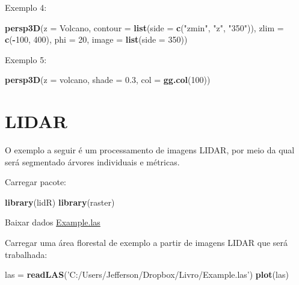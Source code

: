 \documentclass[
]{book}
\newenvironment{Shaded}{\begin{snugshade}}{\end{snugshade}}
\newcommand{\DataTypeTok}[1]{\textcolor[rgb]{0.13,0.29,0.53}{#1}}
\newcommand{\DecValTok}[1]{\textcolor[rgb]{0.00,0.00,0.81}{#1}}
\newcommand{\FloatTok}[1]{\textcolor[rgb]{0.00,0.00,0.81}{#1}}
\newcommand{\KeywordTok}[1]{\textcolor[rgb]{0.13,0.29,0.53}{\textbf{#1}}}
\newcommand{\NormalTok}[1]{#1}
\newcommand{\OperatorTok}[1]{\textcolor[rgb]{0.81,0.36,0.00}{\textbf{#1}}}
\newcommand{\StringTok}[1]{\textcolor[rgb]{0.31,0.60,0.02}{#1}}
\begin{document}
Exemplo 4:

\begin{Shaded}
\begin{Highlighting}[]
\KeywordTok{persp3D}\NormalTok{(}\DataTypeTok{z =}\NormalTok{ Volcano, }\DataTypeTok{contour =} \KeywordTok{list}\NormalTok{(}\DataTypeTok{side =} \KeywordTok{c}\NormalTok{(}\StringTok{"zmin"}\NormalTok{, }\StringTok{"z"}\NormalTok{, }\StringTok{"350"}\NormalTok{)), }\DataTypeTok{zlim =} \KeywordTok{c}\NormalTok{(}\OperatorTok{-}\DecValTok{100}\NormalTok{, }\DecValTok{400}\NormalTok{), }\DataTypeTok{phi =} \DecValTok{20}\NormalTok{, }\DataTypeTok{image =} \KeywordTok{list}\NormalTok{(}\DataTypeTok{side =} \DecValTok{350}\NormalTok{))}
\end{Highlighting}
\end{Shaded}

Exemplo 5:

\begin{Shaded}
\begin{Highlighting}[]
\KeywordTok{persp3D}\NormalTok{(}\DataTypeTok{z =}\NormalTok{ volcano, }\DataTypeTok{shade =} \FloatTok{0.3}\NormalTok{, }\DataTypeTok{col =} \KeywordTok{gg.col}\NormalTok{(}\DecValTok{100}\NormalTok{))}
\end{Highlighting}
\end{Shaded}

\hypertarget{lidar}{%
\section{LIDAR}\label{lidar}}

O exemplo a seguir é um processamento de imagens LIDAR, por meio da qual será segmentado árvores individuais e métricas.

Carregar pacote:

\begin{Shaded}
\begin{Highlighting}[]
\KeywordTok{library}\NormalTok{(lidR)}
\KeywordTok{library}\NormalTok{(raster)}
\end{Highlighting}
\end{Shaded}

Baixar dados
\href{'https://www.dropbox.com/s/e7mlo11k5qeao2i/Example.las?dl=1'}{Example.las}

Carregar uma área florestal de exemplo a partir de imagens LIDAR que será trabalhada:

\begin{Shaded}
\begin{Highlighting}[]
\NormalTok{las =}\StringTok{ }\KeywordTok{readLAS}\NormalTok{(}\StringTok{'C:/Users/Jefferson/Dropbox/Livro/Example.las'}\NormalTok{)}
\KeywordTok{plot}\NormalTok{(las)}
\end{Highlighting}
\end{Shaded}
\end{document}
